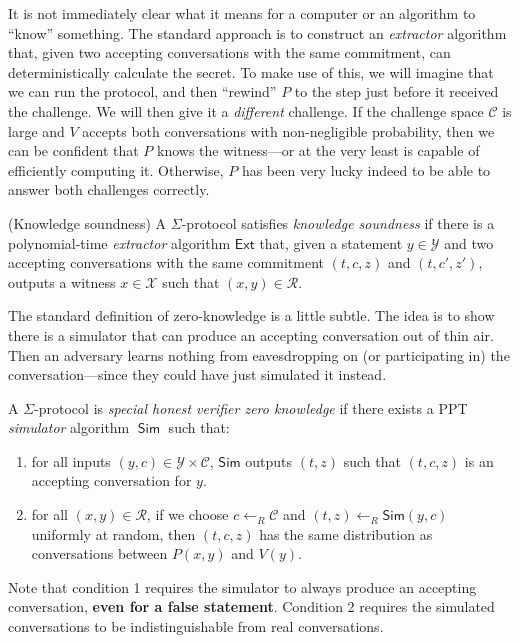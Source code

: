 \documentclass[12pt,a4paper]{article}
\DeclareMathOperator{\Sim}{\mathsf{Sim}}
\theoremstyle{definition}
\newcounter{protocol}
\begin{document}
It is not immediately clear what it means for a computer or an algorithm to ``know'' something. The standard approach is to construct an \textit{extractor} algorithm that, given two accepting conversations with the same commitment, can deterministically calculate the secret. To make use of this, we will imagine that we can run the protocol, and then ``rewind'' $P$ to the step just before it received the challenge. We will then give it a \textit{different} challenge. If the challenge space $\mathcal{C}$ is large and $V$ accepts both conversations with non-negligible probability, then we can be confident that $P$ knows the witness---or at the very least is capable of efficiently computing it. Otherwise, $P$ has been very lucky indeed to be able to answer both challenges correctly.

\begin{definition}(Knowledge soundness)
    A $\Sigma$-protocol satisfies \textit{knowledge soundness} if there is a polynomial-time \textit{extractor} algorithm $\mathsf{Ext}$ that, given a statement $y\in\mathcal{Y}$ and two accepting conversations with the same commitment $(t, c, z)$ and $(t, c', z')$, outputs a witness $x\in\mathcal{X}$ such that $(x, y)\in\mathcal{R}$.
\end{definition}
The standard definition of zero-knowledge is a little subtle. The idea is to show there is a simulator that can produce an accepting conversation out of thin air. Then an adversary learns nothing from eavesdropping on (or participating in) the conversation---since they could have just simulated it instead.
\begin{definition}
    A $\Sigma$-protocol is \textit{special honest verifier zero knowledge} if there exists a PPT \textit{simulator} algorithm $\Sim$ such that:
    \begin{enumerate}
        \item for all inputs $(y, c)\in\mathcal{Y}\times\mathcal{C}$, $\mathsf{Sim}$ outputs $(t, z)$ such that $(t, c, z)$ is an accepting conversation for $y$.
        \item for all $(x, y)\in\mathcal{R}$, if we choose $c\gets_R\mathcal{C}$ and $(t, z)\gets_R\mathsf{Sim}(y, c)$ uniformly at random, then $(t, c, z)$ has the same distribution as conversations between $P(x, y)$ and $V(y)$.
    \end{enumerate}
\end{definition}
Note that condition 1 requires the simulator to always produce an accepting conversation, \textbf{even for a false statement}. Condition 2 requires the simulated conversations to be indistinguishable from real conversations.
\end{document}
